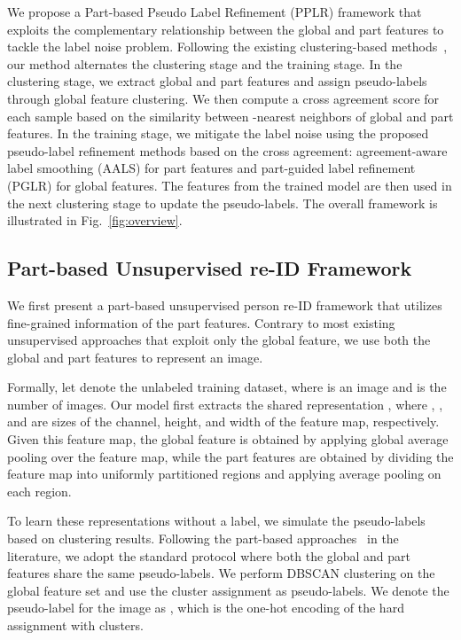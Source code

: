 \documentclass[10pt,twocolumn,letterpaper]{article}
\begin{document}
    We propose a {Part-based Pseudo Label Refinement (PPLR)} framework that exploits the complementary relationship between the global and part features to tackle the label noise problem.
    Following the existing clustering-based methods~\cite{lin2019aBottom, zhang2021refining, zeng2020hierarchical}, our method alternates the clustering stage and the training stage.
    In the clustering stage, we extract global and part features and assign pseudo-labels through global feature clustering.
    We then compute a cross agreement score for each sample based on the similarity between -nearest neighbors of global and part features.
    In the training stage, we mitigate the label noise using the proposed pseudo-label refinement methods based on the cross agreement: {agreement-aware label smoothing (AALS)} for part features and {part-guided label refinement (PGLR)} for global features.
    The features from the trained model are then used in the next clustering stage to update the pseudo-labels.
    The overall framework is illustrated in Fig.~\ref{fig:overview}.

\subsection{Part-based Unsupervised re-ID Framework}
\label{ssec:3-1}
    We first present a part-based unsupervised person re-ID framework that utilizes fine-grained information of the part features.
    Contrary to most existing unsupervised approaches that exploit only the global feature, we use both the global and part features to represent an image.

    Formally, let  denote the unlabeled training dataset, where  is an image and  is the number of images.
    Our model first extracts the shared representation , where , , and  are sizes of the channel, height, and width of the feature map, respectively.
    Given this feature map, the global feature  is obtained by applying global average pooling over the feature map, while the part features  are obtained by dividing the feature map into  uniformly partitioned regions  and applying average pooling on each region.
    
    To learn these representations without a label, we simulate the pseudo-labels based on clustering results.
    Following the part-based approaches~\cite{sun2018beyond, wang2018learning, zheng2019pyramidal} in the literature, we adopt the standard protocol where both the global and part features share the same pseudo-labels.
    We perform DBSCAN clustering \cite{ester1996density} on the global feature set  and use the cluster assignment as pseudo-labels.
    We denote the pseudo-label for the image  as , which is the one-hot encoding of the hard assignment with  clusters.
\end{document}
